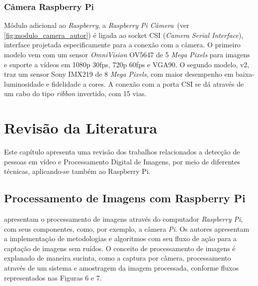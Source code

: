 \documentclass[12pt,oneside,a4paper,chapter=TITLE,section=TITLE,sumario=tradicional]{abntex2}
\begin{document}
\subsection{Câmera Raspberry Pi}

Módulo adicional ao \textit{Raspberry}, a \textit{Raspberry Pi Câmera}~(ver \autoref{fig:modulo_camera_autor}) é ligada ao socket CSI (\textit{Camera Serial Interface}), interface projetada especificamente para a conexão com a câmera. O primeiro modelo vem com um sensor \textit{OmniVision} OV5647 de 5 \textit{Mega Pixels} para imagens e suporte a vídeos em 1080p 30fps, 720p 60fps e VGA90. O segundo modelo, v2, traz um sensor Sony IMX219 de 8 \textit{Mega Pixels}, com maior desempenho em baixa-luminosidade e fidelidade a cores. A conexão com a porta CSI se dá através de um cabo do tipo \textit{ribbon} invertido, com 15 vias.
\cite{raspberrypi_camera}

\begin{figure}[htb]
\end{figure}

\chapter{Revisão da Literatura}
\label{cap:revisao-literatura}

Este capítulo apresenta uma revisão dos trabalhos relacionados a detecção de pessoas em vídeo e Processamento Digital de Imagens, por meio de diferentes técnicas, aplicando-se também ao Raspberry Pi.

\section{Processamento de Imagens com Raspberry Pi}

 apresentam o processamento de imagens através do computador \textit{Raspberry Pi}, com seus componentes, como, por exemplo, a câmera \textit{Pi}. Os autores apresentam a implementação de metodologias e algoritmos com seu fluxo de ação para a captação de imagens sem ruídos. O conceito de processamento de imagens é explanado de maneira sucinta, como a captura por câmera, processamento através de um sistema e amostragem da imagem processada, conforme fluxos representados nas Figuras 6 e 7.
\end{document}
